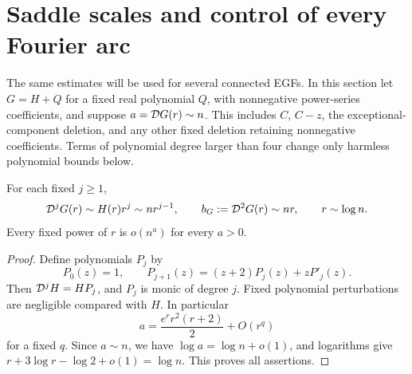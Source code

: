 \section{Saddle scales and control of every Fourier arc}\label{sfh:sec:fourier}
The same estimates will be used for several connected EGFs. In this section let $G=H+Q$ for a fixed real polynomial $Q$, with nonnegative power-series coefficients, and suppose $a=\mathcal D G(r)\sim n$. This includes $C$, $C-z$, the exceptional-component deletion, and any other fixed deletion retaining nonnegative coefficients. Terms of polynomial degree larger than four change only harmless polynomial bounds below.

\begin{lemma}\label{sfh:lem:scales}
For each fixed $j\ge1$,
\begin{equation}\label{sfh:eq:scales}
 \mathcal D^jG(r)\sim H(r)r^j\sim nr^{j-1},\qquad
 b_G:=\mathcal D^2G(r)\sim nr,\qquad r\sim\log n.
\end{equation}
Every fixed power of $r$ is $o(n^a)$ for every $a>0$.
\end{lemma}
\begin{proof}
Define polynomials $P_j$ by
\begin{equation}\label{sfh:eq:P}
 P_0(z)=1,\qquad P_{j+1}(z)=(z+2)P_j(z)+zP'_j(z).
\end{equation}
Then $\mathcal D^jH=HP_j$, and $P_j$ is monic of degree $j$. Fixed polynomial perturbations are negligible compared with $H$. In particular
\[
 a=\frac{e^rr^2(r+2)}2+O(r^q)
\]
for a fixed $q$. Since $a\sim n$, we have $\log a=\log n+o(1)$, and logarithms give $r+3\log r-\log2+o(1)=\log n$. This proves all assertions.
\end{proof}

